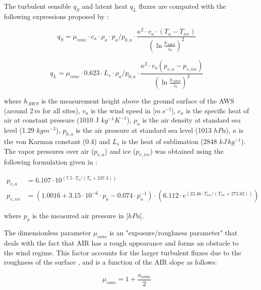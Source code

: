 \documentclass[utf8]{frontiersSCNS} %
\begin{document}
The turbulent sensible $q_{S}$ and latent heat $q_{L}$ fluxes are computed with the following expressions proposed by
\cite{Garratt_1992}:

\begin{equation} q_{S}=\mu_{cone}\cdot c_{a} \cdot \rho_{a} \cdot p_{a}/p_{0,a} \cdot \frac{\kappa^2 \cdot v_a \cdot
		(T_a-T_{ice})}{{(\ln{\frac{h_{AWS}}{z_{0}}})}^2} \label{eqn:qs} \end{equation}

\begin{equation} q_{L}=\mu_{cone}\cdot 0.623 \cdot L_s \cdot \rho_{a}/p_{0,a} \cdot \frac{\kappa^2 \cdot
	v_a(p_{v,a}-p_{v,ice})}{{(\ln{\frac{h_{AWS}}{z_{0}}})}^2} \end{equation}

where $h_{AWS}$ is the measurement height above the ground surface of the AWS (around $2\,m$ for all sites), $v_a$ is
the wind speed in [$m\,s^{-1}$], $c_a$ is the specific heat of air at constant pressure (1010 J $kg^{-1} K^{-1}$),
$\rho_{a}$ is the air density at standard sea level (1.29 $kg m^{-3}$), $p_{0,a}$ is the air pressure at standard sea
level (1013 $hPa$), $\kappa$ is the von Karman constant (0.4) and $L_s$ is the heat of sublimation (2848 $kJ\,kg^{-1}$).
The vapor pressures over air ($p_{v,a}$) and ice ($p_{v,ice}$) was obtained using the following formulation given in
\cite{WMO_2018}:

\begin{equation} \begin{split} p_{v,a}&=6.107 \cdot 10^{(7.5 \cdot T_a / (T_a + 237.3))}\\ p_{v,ice}&=(1.0016 +
		3.15\cdot10^{-6}\cdot p_{a}-0.074\cdot p_{a}^{-1})\cdot(6.112 \cdot e^{(22.46 \cdot T_{ice} / (T_{ice} + 272.62))})
	\end{split} \label{eqn:vp} \end{equation}

where $p_{a}$ is the measured air pressure in [$hPa$].

The dimensionless parameter $\mu_{cone}$ is an "exposure/roughness parameter" that deals with the fact that AIR has a
rough appearance and forms an obstacle to the wind regime. This factor accounts for the larger turbulent fluxes due to
the roughness of the surface \cite{Oerlemans_2021}, and is a function of the AIR slope as follows:

\begin{equation}
	\mu_{cone} = 1 + \frac{s_{cone}}{2}
\end{equation}
\end{document}
